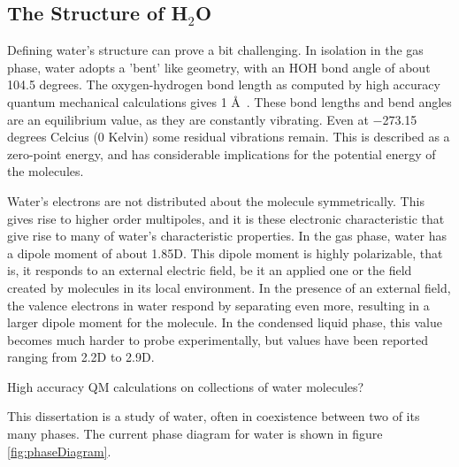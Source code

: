 
\subsection{The Structure of H$_\mathrm{2}$O}
%
%
Defining water's structure can prove a bit challenging. In isolation
in the gas phase, water adopts a 'bent' like geometry, with an HOH
bond angle of about 104.5 degrees. The oxygen-hydrogen bond length as
computed by high accuracy quantum mechanical calculations gives 1
\AA~. These bond lengths and bend angles are an equilibrium value, as
they are constantly vibrating. Even at $-$273.15 degrees Celcius (0
Kelvin) some residual vibrations remain. This is described as a
zero-point energy, and has considerable implications for the potential
energy of the molecules. 

Water's electrons are not distributed about the molecule
symmetrically. This gives rise to higher order multipoles, and it is
these electronic characteristic that give rise to many of water's
characteristic properties. In the gas phase, water has a dipole moment
of about 1.85D. This dipole moment is highly polarizable, that is, it
responds to an external electric field, be it an applied one or the
field created by molecules in its local environment. In the presence
of an external field, the valence electrons in water respond by
separating even more, resulting in a larger dipole moment for the
molecule. In the condensed liquid phase, this value becomes much
harder to probe experimentally, but values have been reported ranging
from 2.2D to 2.9D. 

High accuracy QM calculations on collections of water molecules?


This dissertation is a study of water, often in coexistence between
two of its many phases. The current phase diagram for water is shown
in figure \ref{fig:phaseDiagram}.

